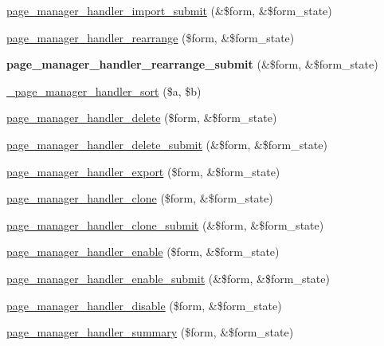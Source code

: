 \begin{DoxyCompactItemize}
\item 
\hyperlink{page__manager_8admin_8inc_a7f17a14b067b7a3c64f31361e3c5426b}{page\_\-manager\_\-handler\_\-import\_\-submit} (\&\$form, \&\$form\_\-state)
\item 
\hyperlink{page__manager_8admin_8inc_a6e324bd1ae431f00d56ddb9ae5ceb280}{page\_\-manager\_\-handler\_\-rearrange} (\$form, \&\$form\_\-state)
\item 
\hypertarget{page__manager_8admin_8inc_af29fa18025a83bd65632b88a62b72fad}{
{\bfseries page\_\-manager\_\-handler\_\-rearrange\_\-submit} (\&\$form, \&\$form\_\-state)}
\label{page__manager_8admin_8inc_af29fa18025a83bd65632b88a62b72fad}

\item 
\hyperlink{page__manager_8admin_8inc_a5eacb554e7d98265ede82a0ae0c3a628}{\_\-page\_\-manager\_\-handler\_\-sort} (\$a, \$b)
\item 
\hyperlink{page__manager_8admin_8inc_aca261eee8f4678610ac48b7b039ff66e}{page\_\-manager\_\-handler\_\-delete} (\$form, \&\$form\_\-state)
\item 
\hyperlink{page__manager_8admin_8inc_ad9484f3b9594148f813df78466ef32ae}{page\_\-manager\_\-handler\_\-delete\_\-submit} (\&\$form, \&\$form\_\-state)
\item 
\hyperlink{page__manager_8admin_8inc_a4ffce6578f5c43b1c89e6099fa711ea1}{page\_\-manager\_\-handler\_\-export} (\$form, \&\$form\_\-state)
\item 
\hyperlink{page__manager_8admin_8inc_abba39e855406ab69c4b4bf6a3630d41f}{page\_\-manager\_\-handler\_\-clone} (\$form, \&\$form\_\-state)
\item 
\hyperlink{page__manager_8admin_8inc_a36671329908ef4a33149f1ae956c5d80}{page\_\-manager\_\-handler\_\-clone\_\-submit} (\&\$form, \&\$form\_\-state)
\item 
\hyperlink{page__manager_8admin_8inc_ab7a195776d4f5b4947fe762f427c9eec}{page\_\-manager\_\-handler\_\-enable} (\$form, \&\$form\_\-state)
\item 
\hyperlink{page__manager_8admin_8inc_a82053012fe27041a8bc78da4b52405bf}{page\_\-manager\_\-handler\_\-enable\_\-submit} (\&\$form, \&\$form\_\-state)
\item 
\hyperlink{page__manager_8admin_8inc_a5a643ed98379483b2caf5b882a03aad4}{page\_\-manager\_\-handler\_\-disable} (\$form, \&\$form\_\-state)
\item 
\hyperlink{page__manager_8admin_8inc_a2b1cdfdd84993c9480b1032309fa8eb4}{page\_\-manager\_\-handler\_\-summary} (\$form, \&\$form\_\-state)
\item 

\end{DoxyCompactItemize}
